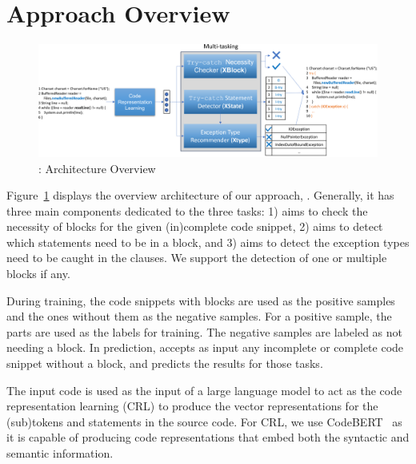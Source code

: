 \section{Approach Overview}
\label{sec:overview}

\begin{figure}[t]
\begin{center}
\includegraphics[width=5.6in]{overview-3.png}
\vspace{-10pt}
\caption{{\tool}: Architecture Overview}
\label{overview}
\end{center}
\end{figure}

Figure~\ref{overview} displays the overview architecture of our
approach, {\tool}. Generally, it has three main components dedicated
to the three tasks: 1) {\xblock} aims to check the necessity of
 blocks for the given (in)complete code snippet,
2){\xstate} aims to detect which statements need to be in a
 block, and 3) {\xtype} aims to detect the exception
types need to be caught in the  clauses. We support the
detection of one or multiple  blocks if any.
     
During training, the code snippets with  blocks are
used as the positive samples and the ones without them as the negative
samples. For a positive sample, the  parts are used as
the labels for training. The negative samples are labeled as not
needing a  block. In prediction, {\tool} accepts as
input any incomplete or complete code snippet without a
 block, and predicts the results for those tasks.

The input code is used as the input of a large language model to act
as the code representation learning (CRL) to produce the vector
representations for the (sub)tokens and statements in the source
code. For CRL, we use CodeBERT~\cite{codebert-emnlp20} as it is
capable of producing code representations that embed both the
syntactic and semantic information. 

